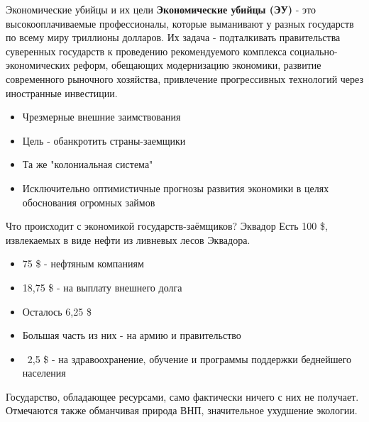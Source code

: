 \documentclass[10pt]{beamer}
\begin{document}
\begin{frame}{Экономические убийцы и их цели}
\textbf{Экономические убийцы (ЭУ)} - это высокооплачиваемые профессионалы, которые выманивают у разных государств по всему миру триллионы долларов. Их задача - подталкивать правительства суверенных государств к проведению рекомендуемого комплекса социально-экономических реформ, обещающих модернизацию экономики, развитие современного рыночного хозяйства, привлечение прогрессивных технологий через иностранные инвестиции.
\vspace{0.5cm}
\begin{itemize}
    \item Чрезмерные внешние заимствования
    \item Цель - обанкротить страны-заемщики
    \item Та же "колониальная система"
    \item Исключительно оптимистичные прогнозы развития экономики в целях обоснования огромных займов
\end{itemize}
\end{frame}

\begin{frame}{Что происходит с экономикой государств-заёмщиков? Эквадор}
 Есть 100 \$, извлекаемых в виде нефти из ливневых лесов Эквадора.
 \vspace{0.5cm}
 \begin{itemize}
    \item 75 \$ - нефтяным компаниям
    \item 18,75 \$ - на выплату внешнего долга
    \item Осталось 6,25 \$
    \item Большая часть из них - на армию и правительство
    \item ~2,5 \$ - на здравоохранение, обучение и программы поддержки беднейшего населения
\end{itemize}
\vspace{0.5cm}
Государство, обладающее ресурсами, само фактически ничего с них не получает.\\
Отмечаются также обманчивая природа ВНП, значительное ухудшение экологии.
\end{frame}
\end{document}
